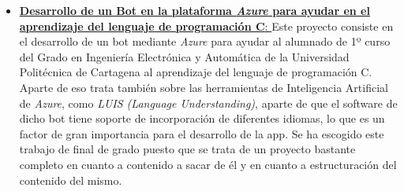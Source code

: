 \begin{itemize}
    \item \href{https://repositorio.upct.es/handle/10317/8004}{\textbf{Desarrollo de un Bot en la plataforma \textit{Azure} para ayudar en el aprendizaje del lenguaje de programación C}: }
    Este proyecto consiste en el desarrollo de un bot mediante \textit{Azure} para ayudar al alumnado de 1º curso del Grado en Ingeniería Electrónica y Automática de la Universidad Politécnica de Cartagena al aprendizaje del lenguaje de programación C.
    Aparte de eso trata también sobre las herramientas de Inteligencia Artificial de \textit{Azure}, como \textit{LUIS (Language Understanding)}, aparte de que el software de dicho bot tiene soporte de incorporación de diferentes idiomas, lo que es un factor de gran importancia para el desarrollo de la app.
    Se ha escogido este trabajo de final de grado puesto que se trata de un proyecto bastante completo en cuanto a contenido a sacar de él y en cuanto a estructuración del contenido del mismo.
\end{itemize}

